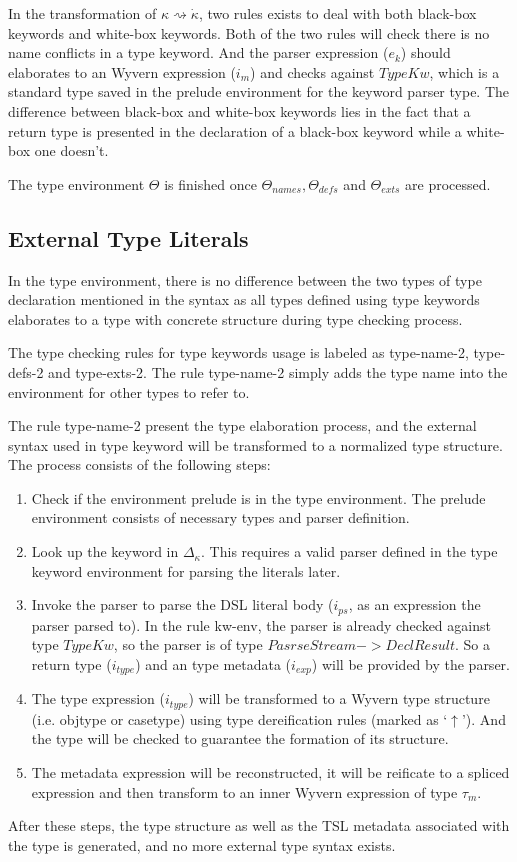 \documentclass{sig-alternate}
\begin{document}
In the transformation of $\kappa\rightsquigarrow\dot\kappa$, two rules exists to deal with both black-box keywords and white-box keywords. Both of the two rules will check there is no name conflicts in a type keyword. And the parser expression ($e_k$) should elaborates to an Wyvern expression ($i_m$) and checks against $TypeKw$, which is a standard type saved in the prelude environment for the keyword parser type. The difference between black-box and white-box keywords lies in the fact that a return type is presented in the declaration of a black-box keyword while a white-box one doesn't.

The type environment $\Theta$ is finished once $\Theta_{names}, \Theta_{defs}$ and $\Theta_{exts}$ are processed.
\subsection{External Type Literals}
In the type environment, there is no difference between the two types of type declaration mentioned in the syntax as all types defined using type keywords elaborates to a type with concrete structure during type checking process.

The type checking rules for type keywords usage is labeled as type-name-2, type-defs-2 and type-exts-2. The rule type-name-2 simply adds the type name into the environment for other types to refer to.

The rule type-name-2 present the type elaboration process, and the external syntax used in type keyword will be transformed to a normalized type structure. The process consists of the following steps:
\begin{enumerate}\setlength{\itemsep}{0pt}
\item Check if the environment prelude is in the type environment. The prelude environment consists of necessary types and parser definition. 
\item Look up the keyword in $\Delta_\kappa$. This requires a valid parser defined in the type keyword environment for parsing the literals later.
\item Invoke the parser to parse the DSL literal body ($i_{ps}$, as an expression the parser parsed to). In the rule kw-env, the parser is already checked against type $TypeKw$, so the parser is of type $PasrseStream->DeclResult$. So a return type ($i_{type}$) and an type metadata ($i_{exp}$) will be provided by the parser.
\item The type expression ($i_{type}$) will be transformed to a Wyvern type structure (i.e. objtype or casetype) using type dereification rules (marked as `$\uparrow$'). And the type will be checked to guarantee the formation of its structure.
\item The metadata expression will be reconstructed, it will be reificate to a spliced expression and then transform to an inner Wyvern expression of type $\tau_m$. 
\end{enumerate} 
After these steps, the type structure as well as the TSL metadata associated with the type is generated, and no more external type syntax exists.
\end{document}
